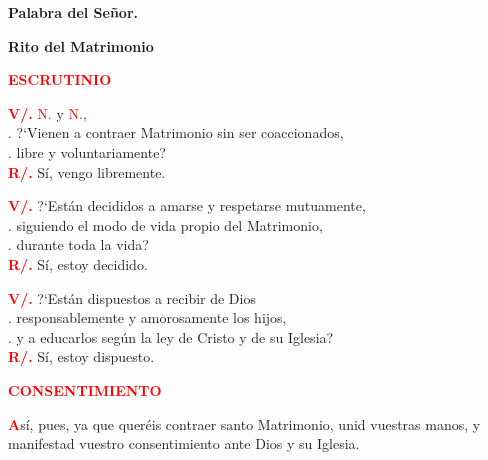 \documentclass[12pt, letterpaper]{report}
\begin{document}
  {\bfseries Palabra del Se\~nor.}

  \clearpage

  \begin{center}
    \Huge {\bfseries Rito del Matrimonio}
  \end{center}

  \Large {\bfseries \textcolor{red}{ESCRUTINIO}}

  \noindent
  \Large {\bfseries \textcolor{red}{V/.}} \hspace{0.5cm} \textcolor{red}{N.} y \textcolor{red}{N.}, \\
  .\hspace{1.5cm} ?`Vienen a contraer Matrimonio sin ser coaccionados,\\
  .\hspace{1.5cm}  libre y voluntariamente?\\
  \Large {\bfseries \textcolor{red}{R/.}} \hspace{0.5cm} S\'i, vengo libremente.

  \noindent
  \Large  {\bfseries \textcolor{red}{V/.}} \hspace{0.5cm} ?`Est\'an decididos a amarse y respetarse mutuamente, \\
  .\hspace{1.5cm} siguiendo el modo de vida propio del Matrimonio, \\
  .\hspace{1.5cm} durante toda la vida?\\
  \Large {\bfseries \textcolor{red}{R/.}} \hspace{0.5cm} S\'i, estoy decidido.

  \noindent
  \Large {\bfseries \textcolor{red}{V/.}} \hspace{0.5cm} ?`Est\'an dispuestos a recibir de Dios \\
  .\hspace{1.5cm} responsablemente y amorosamente los hijos, \\
  .\hspace{1.5cm} y a educarlos seg\'un la ley de Cristo y de su Iglesia?\\
  \Large {\bfseries \textcolor{red}{R/.}} \hspace{0.5cm} S\'i, estoy dispuesto.

  \Large {\bfseries \textcolor{red}{CONSENTIMIENTO}}

  \Large \lettrine[lines=2]{\bfseries \textcolor{red}{A}}{}s\'i, pues, ya que quer\'eis contraer santo Matrimonio, unid vuestras manos, y manifestad vuestro consentimiento ante Dios y su Iglesia.
\end{document}
